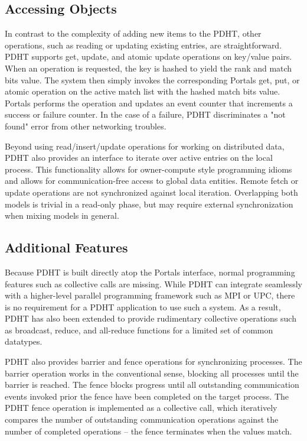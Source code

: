 \subsection{Accessing Objects}

In contrast to the complexity of adding new items to the PDHT, other
operations, such as reading or updating existing entries, are straightforward.
PDHT supports get, update, and atomic update operations on key/value pairs.
When an operation is requested, the key is hashed to yield the rank and match
bits value. The system then simply invokes the corresponding Portals get, put, or
atomic operation on the active match list with the hashed match bits value.
Portals performs the operation and updates an event counter that increments a
success or failure counter. In the case of a failure, PDHT discriminates a "not
found" error from other networking troubles.

Beyond using read/insert/update operations for working on distributed data,
PDHT also provides an interface to iterate over active entries on the local
process. This functionality allows for owner-compute style programming idioms
and allows for communication-free access to global data entities. Remote fetch
or update operations are not synchronized against local iteration. Overlapping
both models is trivial in a read-only phase, but may require external
synchronization when mixing models in general.


\subsection{Additional Features}

Because PDHT is built directly atop the Portals interface, normal programming
features such as collective calls are missing. While PDHT can integrate
seamlessly with a higher-level parallel programming framework such as MPI or
UPC, there is no requirement for a PDHT application to use such a system. As a
result, PDHT has also been extended to provide rudimentary collective
operations such as broadcast, reduce, and all-reduce functions for a limited
set of common datatypes.

PDHT also provides barrier and fence operations for synchronizing processes.
The barrier operation works in the conventional sense, blocking all processes
until the barrier is reached. The fence blocks progress until all outstanding
communication events invoked prior the fence have been completed on the target
process. The PDHT fence operation is implemented as a collective call, which
iteratively compares the number of outstanding communication operations against
the number of completed operations -- the fence terminates when the values
match. 

